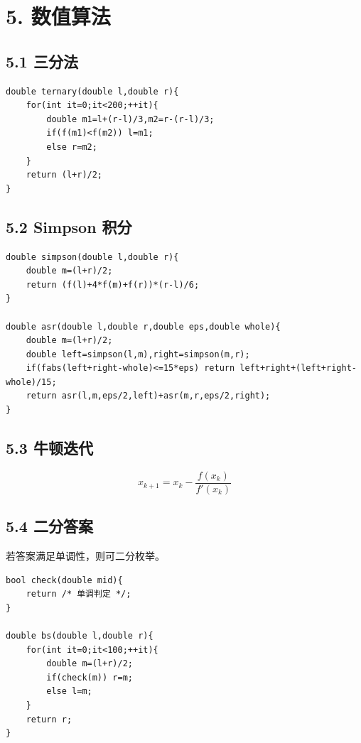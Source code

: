 \documentclass[UTF8,a4paper,11pt]{ctexart}
\begin{document}
\section*{5. 数值算法}

\subsection*{5.1 三分法}

\begin{Verbatim}[fontsize=\small,frame=single,breaklines=true,breakanywhere=true]
double ternary(double l,double r){
    for(int it=0;it<200;++it){
        double m1=l+(r-l)/3,m2=r-(r-l)/3;
        if(f(m1)<f(m2)) l=m1;
        else r=m2;
    }
    return (l+r)/2;
}
\end{Verbatim}

\subsection*{5.2 Simpson 积分}

\begin{Verbatim}[fontsize=\small,frame=single,breaklines=true,breakanywhere=true]
double simpson(double l,double r){
    double m=(l+r)/2;
    return (f(l)+4*f(m)+f(r))*(r-l)/6;
}

double asr(double l,double r,double eps,double whole){
    double m=(l+r)/2;
    double left=simpson(l,m),right=simpson(m,r);
    if(fabs(left+right-whole)<=15*eps) return left+right+(left+right-whole)/15;
    return asr(l,m,eps/2,left)+asr(m,r,eps/2,right);
}
\end{Verbatim}

\subsection*{5.3 牛顿迭代}

\[
x_{k+1}=x_k-\frac{f(x_k)}{f'(x_k)}
\]


\subsection*{5.4 二分答案}

若答案满足单调性，则可二分枚举。

\begin{Verbatim}[fontsize=\small,frame=single,breaklines=true,breakanywhere=true]
bool check(double mid){
    return /* 单调判定 */;
}

double bs(double l,double r){
    for(int it=0;it<100;++it){
        double m=(l+r)/2;
        if(check(m)) r=m;
        else l=m;
    }
    return r;
}
\end{Verbatim}
\end{document}
